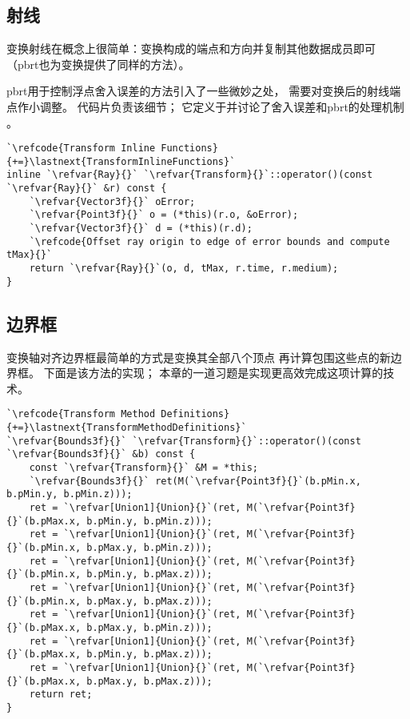 \subsection{射线}\label{sub:射线}
变换射线在概念上很简单：变换构成的端点和方向并复制其他数据成员即可
（pbrt也为变换提供了同样的方法）。

pbrt用于控制浮点舍入误差的方法引入了一些微妙之处，
需要对变换后的射线端点作小调整。
代码片负责该细节；
它定义于并讨论了舍入误差和pbrt的处理机制
。
\begin{lstlisting}
`\refcode{Transform Inline Functions}{+=}\lastnext{TransformInlineFunctions}`
inline `\refvar{Ray}{}` `\refvar{Transform}{}`::operator()(const `\refvar{Ray}{}` &r) const { 
    `\refvar{Vector3f}{}` oError;
    `\refvar{Point3f}{}` o = (*this)(r.o, &oError);
    `\refvar{Vector3f}{}` d = (*this)(r.d);
    `\refcode{Offset ray origin to edge of error bounds and compute tMax}{}`
    return `\refvar{Ray}{}`(o, d, tMax, r.time, r.medium);
}
\end{lstlisting}

\subsection{边界框}\label{sub:边界框}
变换轴对齐边界框最简单的方式是变换其全部八个顶点
再计算包围这些点的新边界框。
下面是该方法的实现；
本章的一道习题是实现更高效完成这项计算的技术。
\begin{lstlisting}
`\refcode{Transform Method Definitions}{+=}\lastnext{TransformMethodDefinitions}`
`\refvar{Bounds3f}{}` `\refvar{Transform}{}`::operator()(const `\refvar{Bounds3f}{}` &b) const {
    const `\refvar{Transform}{}` &M = *this;
    `\refvar{Bounds3f}{}` ret(M(`\refvar{Point3f}{}`(b.pMin.x, b.pMin.y, b.pMin.z)));    
    ret = `\refvar[Union1]{Union}{}`(ret, M(`\refvar{Point3f}{}`(b.pMax.x, b.pMin.y, b.pMin.z)));
    ret = `\refvar[Union1]{Union}{}`(ret, M(`\refvar{Point3f}{}`(b.pMin.x, b.pMax.y, b.pMin.z)));
    ret = `\refvar[Union1]{Union}{}`(ret, M(`\refvar{Point3f}{}`(b.pMin.x, b.pMin.y, b.pMax.z)));
    ret = `\refvar[Union1]{Union}{}`(ret, M(`\refvar{Point3f}{}`(b.pMin.x, b.pMax.y, b.pMax.z)));
    ret = `\refvar[Union1]{Union}{}`(ret, M(`\refvar{Point3f}{}`(b.pMax.x, b.pMax.y, b.pMin.z)));
    ret = `\refvar[Union1]{Union}{}`(ret, M(`\refvar{Point3f}{}`(b.pMax.x, b.pMin.y, b.pMax.z)));
    ret = `\refvar[Union1]{Union}{}`(ret, M(`\refvar{Point3f}{}`(b.pMax.x, b.pMax.y, b.pMax.z)));
    return ret;
}
\end{lstlisting}

